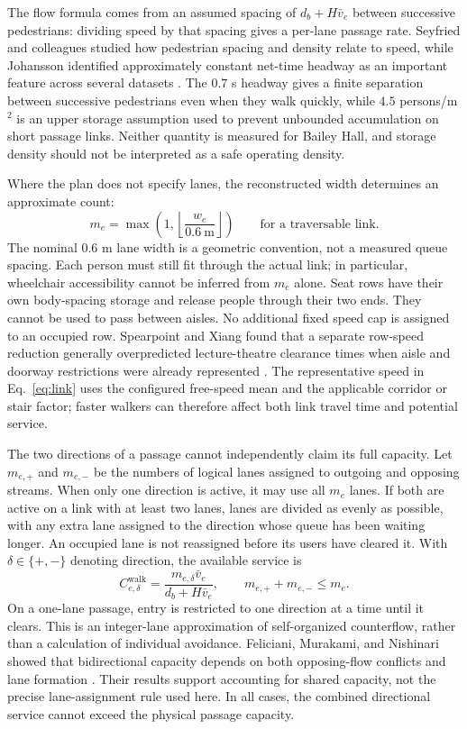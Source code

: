 \documentclass[11pt,a4paper]{article}
\begin{document}
The flow formula comes from an assumed spacing of $d_b+H\bar v_e$ between successive pedestrians: dividing speed by that spacing gives a per-lane passage rate. Seyfried and colleagues studied how pedestrian spacing and density relate to speed, while Johansson identified approximately constant net-time headway as an important feature across several datasets \cite{seyfried,johansson}. The $0.7$ s headway gives a finite separation between successive pedestrians even when they walk quickly, while $4.5$ persons/m$^2$ is an upper storage assumption used to prevent unbounded accumulation on short passage links. Neither quantity is measured for Bailey Hall, and storage density should not be interpreted as a safe operating density.

Where the plan does not specify lanes, the reconstructed width determines an approximate count:
\begin{equation}\label{eq:lanes}
m_e=\max\!\left(1,\left\lfloor \frac{w_e}{0.6\ \mathrm{m}}\right\rfloor\right)
\qquad\text{for a traversable link}.
\end{equation}
The nominal $0.6$ m lane width is a geometric convention, not a measured queue spacing. Each person must still fit through the actual link; in particular, wheelchair accessibility cannot be inferred from $m_e$ alone. Seat rows have their own body-spacing storage and release people through their two ends. They cannot be used to pass between aisles. No additional fixed speed cap is assigned to an occupied row. Spearpoint and Xiang found that a separate row-speed reduction generally overpredicted lecture-theatre clearance times when aisle and doorway restrictions were already represented \cite{spearpoint}. The representative speed in Eq.~\eqref{eq:link} uses the configured free-speed mean and the applicable corridor or stair factor; faster walkers can therefore affect both link travel time and potential service.

The two directions of a passage cannot independently claim its full capacity. Let $m_{e,+}$ and $m_{e,-}$ be the numbers of logical lanes assigned to outgoing and opposing streams. When only one direction is active, it may use all $m_e$ lanes. If both are active on a link with at least two lanes, lanes are divided as evenly as possible, with any extra lane assigned to the direction whose queue has been waiting longer. An occupied lane is not reassigned before its users have cleared it. With $\delta\in\{+,-\}$ denoting direction, the available service is
\begin{equation}\label{eq:direction}
C_{e,\delta}^{\mathrm{walk}}=
\frac{m_{e,\delta}\bar v_e}{d_b+H\bar v_e},
\qquad m_{e,+}+m_{e,-}\leq m_e.
\end{equation}
On a one-lane passage, entry is restricted to one direction at a time until it clears. This is an integer-lane approximation of self-organized counterflow, rather than a calculation of individual avoidance. Feliciani, Murakami, and Nishinari showed that bidirectional capacity depends on both opposing-flow conflicts and lane formation \cite{feliciani2018}. Their results support accounting for shared capacity, not the precise lane-assignment rule used here. In all cases, the combined directional service cannot exceed the physical passage capacity.
\end{document}
